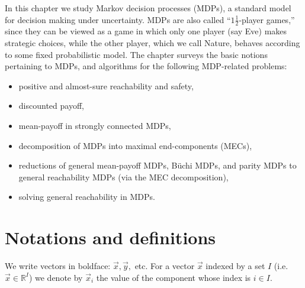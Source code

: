 


In this chapter we study Markov decision processes (MDPs), a standard model for decision making under uncertainty. MDPs are also called ``$1\frac{1}{2}$-player games,'' since they can be viewed as a game in which only one player (say Eve) makes strategic choices, while the other player, which we call Nature, behaves according to some fixed probabilistic model. The chapter surveys the basic notions pertaining to MDPs, and algorithms for the following MDP-related problems:

\begin{itemize}
\item positive and almost-sure reachability and safety,
\item discounted payoff,
\item mean-payoff in strongly connected MDPs,
\item decomposition of MDPs into maximal end-components (MECs),
\item reductions of general mean-payoff MDPs, B\"uchi MDPs, and parity MDPs to general reachability MDPs (via the MEC decomposition),
\item solving general reachability in MDPs.
\end{itemize}



\section*{Notations and definitions}

We write vectors in boldface: $ \vec{x}, \vec{y}, $ etc. For a vector $ \vec{x} $ indexed by a set $ I $ (i.e. $ \vec{x}\in \mathbb{R}^I $) we denote by $ \vec{x}_i $ the value of the component whose index is  $i\in I  $. 

